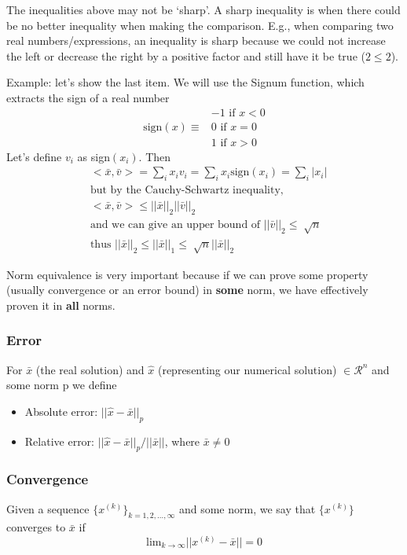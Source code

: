 \documentclass[12pt]{article}
\begin{document}
The inequalities above may not be `sharp'. A sharp inequality is when there could be no better inequality when making the comparison. E.g., when comparing two real numbers/expressions, an inequality is sharp because we could not increase the left or decrease the right by a positive factor and still have it be true ($2 \leq 2$). 

Example: let's show the last item. We will use the Signum function, which extracts the sign of a real number
\begin{align}
              & -1 \text{ if } x < 0 \nonumber \\
\text{sign}(x) \equiv &  0 \text{ if } x = 0 \nonumber \\
              &  1 \text{ if } x > 0 \nonumber
\end{align}
%
Let's define $v_i$ as sign$(x_i)$. Then
%
\begin{align}
&< \bar{x}, \bar{v} > = \sum_i x_i v_i = \sum_i x_i \text{sign}(x_i) = \sum_i |x_i| \nonumber \\
%
&\text{but by the Cauchy-Schwartz inequality,}\nonumber \\
%
&< \bar{x}, \bar{v} > \leq ||\bar{x}||_2 ||\bar{v}||_2 \nonumber \\
%
&\text{and we can give an upper bound of } ||\bar{v}||_2 \leq \sqrt[]{n} \nonumber \\ 
%
&\text{thus } ||\bar{x}||_2 \leq ||\bar{x}||_1 \leq \sqrt[]{n} ||\bar{x}||_2 \nonumber
\end{align}

Norm equivalence is very important because if we can prove some property (usually convergence or an error bound) in \textbf{some} norm, we have effectively proven it in \textbf{all} norms. 

\subsubsection{Error}
For $\bar{x}$ (the real solution) and $\hat{x}$ (representing our numerical solution) $\in \mathcal{R}^n$ and some norm p we define
%
\begin{itemize}
\item Absolute error: $||\hat{x} - \bar{x}||_p$
\item Relative error: $||\hat{x} - \bar{x}||_p / ||\bar{x}||$, where $\bar{x} \neq 0$
\end{itemize}

\subsubsection{Convergence}
Given a sequence $\lbrace x^{(k)} \rbrace_{k=1,2,\dots,\infty}$ and some norm, we say that $\lbrace x^{(k)} \rbrace$ converges to $\bar{x}$ if
%
\begin{equation}
\displaystyle\text{lim}_{k \rightarrow \infty} ||x^{(k)} - \bar{x}|| = 0 \nonumber
\end{equation}
\end{document}
